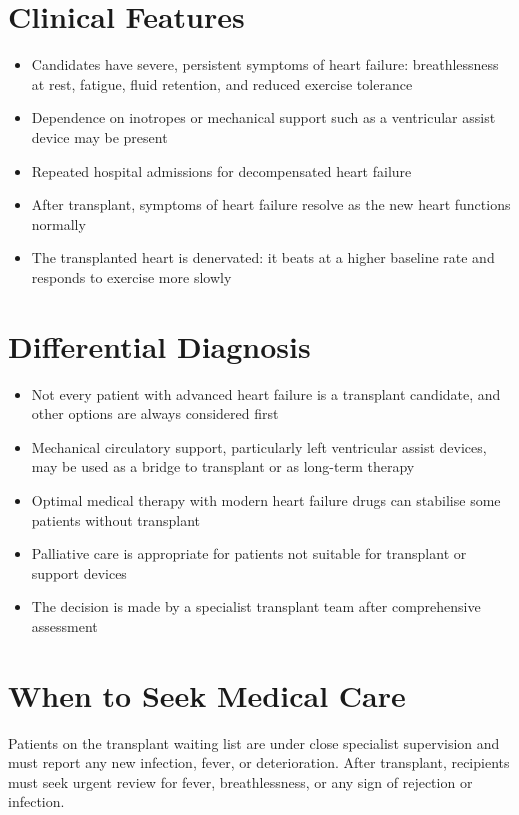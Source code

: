 \section*{Clinical Features}
\begin{itemize}
    \item Candidates have severe, persistent symptoms of heart failure: breathlessness at rest, fatigue, fluid retention, and reduced exercise tolerance
    \item Dependence on inotropes or mechanical support such as a ventricular assist device may be present
    \item Repeated hospital admissions for decompensated heart failure
    \item After transplant, symptoms of heart failure resolve as the new heart functions normally
    \item The transplanted heart is denervated: it beats at a higher baseline rate and responds to exercise more slowly
\end{itemize}

\section*{Differential Diagnosis}
\begin{itemize}
    \item Not every patient with advanced heart failure is a transplant candidate, and other options are always considered first
    \item Mechanical circulatory support, particularly left ventricular assist devices, may be used as a bridge to transplant or as long-term therapy
    \item Optimal medical therapy with modern heart failure drugs can stabilise some patients without transplant
    \item Palliative care is appropriate for patients not suitable for transplant or support devices
    \item The decision is made by a specialist transplant team after comprehensive assessment
\end{itemize}

\section*{When to Seek Medical Care}
Patients on the transplant waiting list are under close specialist supervision and must report any new infection, fever, or deterioration. After transplant, recipients must seek urgent review for fever, breathlessness, or any sign of rejection or infection.

